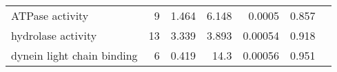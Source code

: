 \begin{longtable}{|l|r|r|r|r|r|}
                              ATPase activity &                       9 &                   1.464 &      6.148 &               0.0005 &                       0.857~~ \\
                           hydrolase activity &                      13 &                   3.339 &      3.893 &              0.00054 &                       0.918~~ \\
                   dynein light chain binding &                       6 &                   0.419 &       14.3 &              0.00056 &                       0.951~~ \\
\end{longtable}

